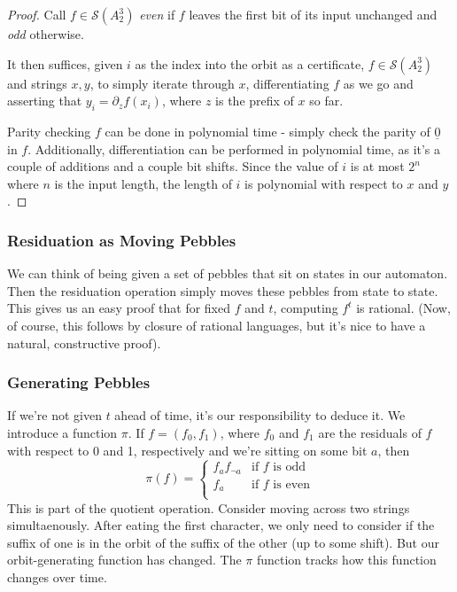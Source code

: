 \documentclass[11pt]{book}
\theoremstyle{pleasant}
\newcommand{\0}{\underline{0}}
\newcommand{\1}{\underline{1}}
\newcommand{\2}{\underline{2}}
\renewcommand{\S}{\mathcal{S}}
\begin{document}
\begin{proof}
Call $f \in \S(A^3_2)$ \textit{even} if $f$ leaves the first bit of its input unchanged and \textit{odd} otherwise.

It then suffices, given $i$ as the index into the orbit as a certificate, $f \in \S(A^3_2)$ and strings $x, y$, to simply iterate through $x$, differentiating $f$ as we go and asserting that $y_i = \partial_zf(x_i)$, where $z$ is the prefix of $x$ so far.

Parity checking $f$ can be done in polynomial time - simply check the parity of $\0$ in $f$. Additionally, differentiation can be performed in polynomial time, as it's a couple of additions and a couple bit shifts. Since the value of $i$ is at most $2^n$ where $n$ is the input length, the length of $i$ is polynomial with respect to $x$ and $y$.
\end{proof}



\subsubsection*{Residuation as Moving Pebbles}
We can think of being given a set of pebbles that sit on states in our automaton. Then the residuation operation simply moves these pebbles from state to state. This gives us an easy proof that for fixed $f$ and $t$, computing $f^t$ is rational. (Now, of course, this follows by closure of rational languages, but it's nice to have a natural, constructive proof).

\subsubsection*{Generating Pebbles}
If we're not given $t$ ahead of time, it's our responsibility to deduce it. We introduce a function $\pi$. If $f = (f_0, f_1)$, where $f_0$ and $f_1$ are the residuals of $f$ with respect to 0 and 1, respectively and we're sitting on some bit $a$, then
$$\pi(f) = \begin{cases}
f_af_{\neg a} & \text{if $f$ is odd} \\
f_a & \text{if $f$ is even} \\
\end{cases}$$
This is part of the quotient operation. Consider moving across two strings simultaenously. After eating the first character, we only need to consider if the suffix of one is in the orbit of the suffix of the other (up to some shift). But our orbit-generating function has changed. The $\pi$ function tracks how this function changes over time.
\end{document}
